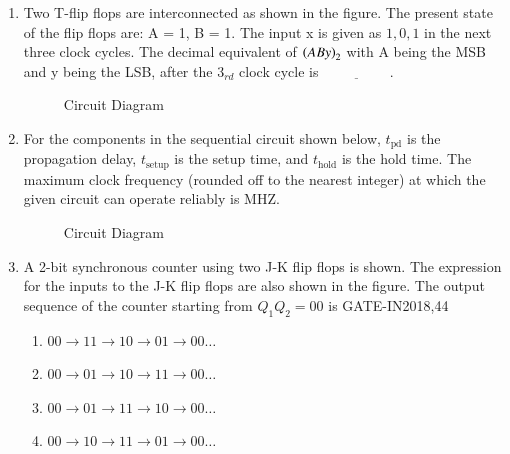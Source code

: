 \begin{enumerate}
\item Two T-flip flops are interconnected as shown in the figure. The present state of the flip flops are: A = 1, B = 1. The input x is given as $1, 0, 1$ in the next three clock cycles. The decimal equivalent of $\left(ABy\right)_{2}$ with A being the MSB and y being the LSB, after the $3_{rd}$ clock cycle is $\underline{\hspace{2cm}}$.
\hfill{}
\begin{figure}[H]

\caption{Circuit Diagram}

\end{figure}

\item For the components in the sequential circuit shown below, $t_{\text{pd}}$ is the propagation delay, $t_{\text{setup}}$ is the setup time, and $t_{\text{hold}}$ is the hold time. The maximum clock frequency (rounded off to the nearest integer) at which the given circuit can operate reliably is \underline{\hspace{1cm}}MHZ.
\hfill{}

\begin{figure}[H]

\caption{Circuit Diagram}

\end{figure}

\item A 2-bit synchronous counter using two J-K flip flops is shown. The expression for the inputs to the J-K flip flops are also shown in the figure. The output sequence of the counter starting from $Q_{1}Q_{2} = 00$ is
\hfill{GATE-IN2018,44}
\begin{figure}[!ht]
\centering

\label{fig:block_diagram}
\end{figure}
\begin{enumerate}[label=\Alph*.]
\item $00 \rightarrow 11 \rightarrow 10 \rightarrow 01 \rightarrow 00 \hdots $
\item $00 \rightarrow 01 \rightarrow 10 \rightarrow 11 \rightarrow 00 \hdots $
\item $00 \rightarrow 01 \rightarrow 11 \rightarrow 10 \rightarrow 00 \hdots $
\item $00 \rightarrow 10 \rightarrow 11 \rightarrow 01 \rightarrow 00 \hdots $
\end{enumerate}



















\end{enumerate}
